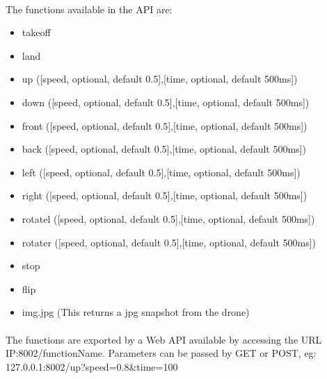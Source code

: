 \documentclass[11pt,twoside,a4paper]{article}
\begin{document}
\paragraph {} The functions available in the API are:
\begin{itemize}
\item takeoff
\item land
\item up ([speed, optional, default 0.5],[time, optional, default 500ms])
\item down ([speed, optional, default 0.5],[time, optional, default 500ms])
\item front ([speed, optional, default 0.5],[time, optional, default 500ms])
\item back ([speed, optional, default 0.5],[time, optional, default 500ms])
\item left ([speed, optional, default 0.5],[time, optional, default 500ms])
\item right ([speed, optional, default 0.5],[time, optional, default 500ms])
\item rotatel ([speed, optional, default 0.5],[time, optional, default 500ms])
\item rotater ([speed, optional, default 0.5],[time, optional, default 500ms])
\item stop
\item flip
\item img.jpg (This returns a jpg snapshot from the drone)
\end{itemize}
\paragraph {} The functions are exported by a Web API available by accessing
the URL IP:8002/functionName. Parameters can be passed by GET or POST,
eg: 127.0.0.1:8002/up?speed=0.8\&time=100
\end{document}
